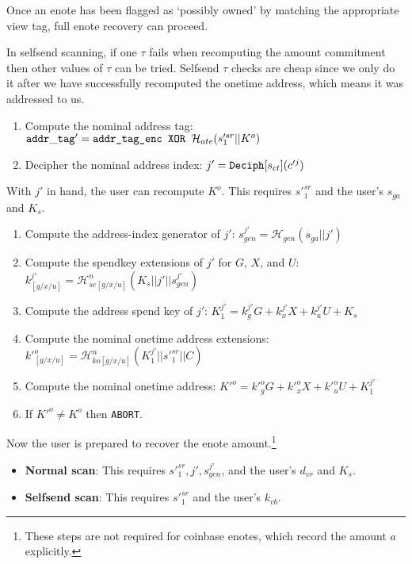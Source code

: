 Once an enote has been flagged as `possibly owned' by matching the appropriate view tag, full enote recovery can proceed.

In selfsend scanning, if one $\tau$ fails when recomputing the amount commitment then other values of $\tau$ can be tried. Selfsend $\tau$ checks are cheap since we only do it after we have successfully recomputed the onetime address, which means it was addressed to us.

\begin{enumerate}
    \item Compute the nominal address tag: ${\tt addr\_tag}' = \textrm{\tt addr\_tag\_enc XOR } \mathcal{H}_{ate}(s'^{sr}_1 || K^o)$

    \item Decipher the nominal address index: $j' = {\tt Deciph}[s_{ct}](c'^j)$
\end{enumerate}

With $j'$ in hand, the user can recompute $K^o$. This requires $s'^{sr}_1$ and the user's $s_{ga}$ and $K_s$.

\begin{enumerate}
    \item Compute the address-index generator of $j'$: $s^{j'}_{gen} =  \mathcal{H}_{gen}(s_{ga} || j')$

    \item Compute the spendkey extensions of $j'$ for $G$, $X$, and $U$: $k^{j'}_{[g/x/u]} = \mathcal{H}^n_{se[g/x/u]}(K_s || j' || s^{j'}_{gen})$

    \item Compute the address spend key of $j'$: $K^{j'}_1 = k^{j'}_g G + k^{j'}_x X + k^{j'}_u U + K_s$

    \item Compute the nominal onetime address extensions: $k'^o_{[g/x/u]} = \mathcal{H}^n_{ko[g/x/u]}(K^{j'}_1 || s'^{sr}_1 || C)$

    \item Compute the nominal onetime address: $K'^o = k'^o_g G + k'^o_x X + k'^o_u U + K^{j'}_1$

    \item If $K'^o \neq K^o$ then {\tt ABORT}.
\end{enumerate}

Now the user is prepared to recover the enote amount.\footnote{These steps are not required for coinbase enotes, which record the amount $a$ explicitly.}
\begin{itemize}
    \item \textbf{Normal scan}: This requires $s'^{sr}_1, j', s^{j'}_{gen}$, and the user's $d_{vr}$ and $K_s$.

    \item \textbf{Selfsend scan}: This requires $s'^{sr}_1$ and the user's $k_{vb}$.
\end{itemize}

